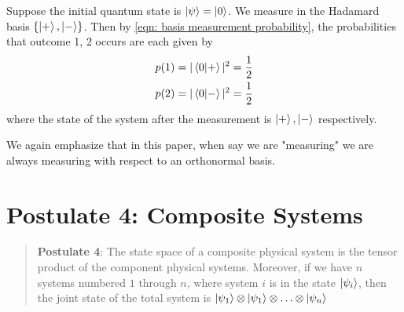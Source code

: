 
\begin{example}
Suppose the initial quantum state is $\ket{\psi}=\ket{0}$. We measure in the Hadamard basis $\{\ket{+}, \ket{-}\}$. Then by \eqref{eqn: basis measurement probability}, the probabilities that outcome 1, 2 occurs are each given by
\begin{gather}
    p(1)=|\braket{0|+}|^2=\frac{1}{2}\\
    p(2)=|\braket{0|-}|^2=\frac{1}{2}
\end{gather}
where the state of the system after the measurement is $\ket{+}, \ket{-}$ respectively.
\end{example}



We again emphasize that in this paper, when say we are "measuring" we are always measuring with respect to an orthonormal basis.


 \pagebreak
 
 
 
 
 


\pagebreak
\section{Postulate 4: Composite Systems} \label{section: composite systems}
\begin{quote}
    \textbf{Postulate 4}:  The state space of a composite physical system is the tensor product of the component physical systems. Moreover, if we have $n$ systems numbered $1$ through $n$, where system $i$ is in the state $\ket{\psi_i}$, then the joint state of the total system is $\ket{\psi_1} \otimes \ket{\psi_1} \otimes \hdots \otimes \ket{\psi_n}$
\end{quote}



